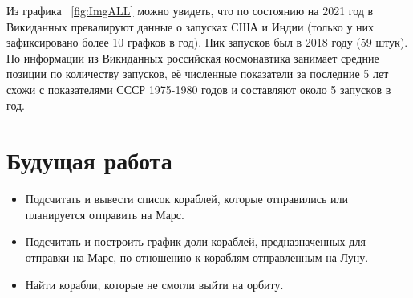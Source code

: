 Из графика ~\ref{fig:ImgALL} можно увидеть, что по состоянию на 2021 год в Викиданных превалируют данные о запусках США и Индии (только у них зафиксировано более 10 графков в год). Пик запусков был в 2018 году (59 штук). По информации из Викиданных российская космонавтика занимает средние позиции по количеству запусков, её численные показатели за последние 5 лет схожи с показателями СССР 1975-1980 годов и составляют около 5 запусков в год.

\section{Будущая работа}
\begin{itemize}
  \item Подсчитать и вывести список кораблей, которые отправились или планируется отправить на Марс.
  \item Подсчитать и построить график доли кораблей, предназначенных для отправки на Марс, по отношению к кораблям отправленным на Луну.
  \item Найти корабли, которые не смогли выйти на орбиту.
\end{itemize}
